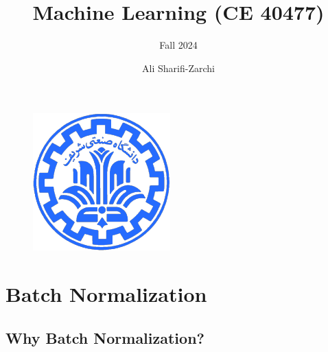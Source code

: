 \documentclass[serif, aspectratio=169]{beamer}
\author{Ali Sharifi-Zarchi}
\title{Machine Learning (CE 40477)}
\subtitle{Fall 2024}
\institute{
    CE Department \\
    Sharif University of Technology
}
\begin{document}
\begin{frame}
    \titlepage
    \vspace*{-0.6cm}
    \begin{figure}[htpb]
        \begin{center}
            \includegraphics[keepaspectratio, scale=0.25]{pic/sharif-main-logo.png}
        \end{center}
    \end{figure}
\end{frame}

\begin{frame}    
\tableofcontents[sectionstyle=show,
subsectionstyle=show/shaded/hide,
subsubsectionstyle=show/shaded/hide]
\end{frame}


\section{Batch Normalization}


\subsection{Why Batch Normalization?}
\end{document}
